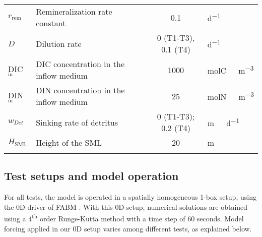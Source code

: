 \documentclass[gmd, manuscript]{copernicus}
\begin{document}
\begin{table*}[htb]
\begin{tabular}{l l c l}
    $r_{\text{rem}}$   & Remineralization rate constant    & 0.1   & \unit{d^{-1}} \\
    $D$   & Dilution rate    & 0 (T1-T3), 0.1 (T4)   & \unit{d^{-1}} \\
    DIC$_{\text{in}}$   & DIC concentration in the inflow medium  & 1000   & \unit{molC\ m^{-3}} \\
    DIN$_{\text{in}}$   & DIN concentration in the inflow medium  & 25   & \unit{molN\ m^{-3}} \\
    $w_{Det}$   & Sinking rate of detritus    & 0 (T1-T3); 0.2 (T4)   & \unit{m\  d^{-1}} \\
    $H_{\text{SML}}$   & Height of the SML    & 20   & \unit{m} \\
    \bottomhline
  \end{tabular}
  \belowtable{} %
\end{table*}

\subsection{Test setups and model operation}\label{S:DescSetup}
    For all tests, the model is operated in a spatially homogeneous 1-box setup, using the 0D driver of FABM \citep{Bruggeman2014}. With this 0D setup, numerical solutions are obtained using a 4\textsuperscript{th} order Runge-Kutta method with a time step of 60 seconds. Model forcing applied in our 0D setup varies among different tests, as explained below.
\end{document}
